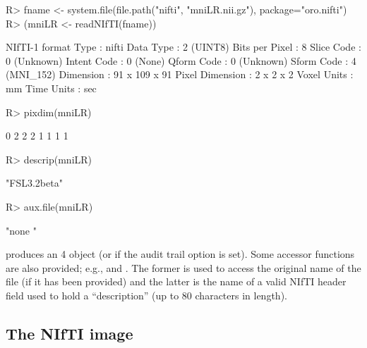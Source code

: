 \documentclass[
]{article}
\begin{document}
\begin{CodeChunk}

\begin{CodeInput}
R> fname <- system.file(file.path("nifti", "mniLR.nii.gz"), package="oro.nifti")
R> (mniLR <- readNIfTI(fname))
\end{CodeInput}

\begin{CodeOutput}
NIfTI-1 format
  Type            : nifti
  Data Type       : 2 (UINT8)
  Bits per Pixel  : 8
  Slice Code      : 0 (Unknown)
  Intent Code     : 0 (None)
  Qform Code      : 0 (Unknown)
  Sform Code      : 4 (MNI_152)
  Dimension       : 91 x 109 x 91
  Pixel Dimension : 2 x 2 x 2
  Voxel Units     : mm
  Time Units      : sec
\end{CodeOutput}

\begin{CodeInput}
R> pixdim(mniLR)
\end{CodeInput}

\begin{CodeOutput}
[1] 0 2 2 2 1 1 1 1
\end{CodeOutput}

\begin{CodeInput}
R> descrip(mniLR)
\end{CodeInput}

\begin{CodeOutput}
[1] "FSL3.2beta"
\end{CodeOutput}

\begin{CodeInput}
R> aux.file(mniLR)
\end{CodeInput}

\begin{CodeOutput}
[1] "none                   "
\end{CodeOutput}
\end{CodeChunk}

produces an 4  object (or
 if the audit trail option is set). Some
accessor functions are also provided; e.g.,  and
. The former is used to access the original name of the
file (if it has been provided) and the latter is the name of a valid
NIfTI header field used to hold a ``description'' (up to 80 characters
in length).

\subsection{The NIfTI image}
\end{document}
